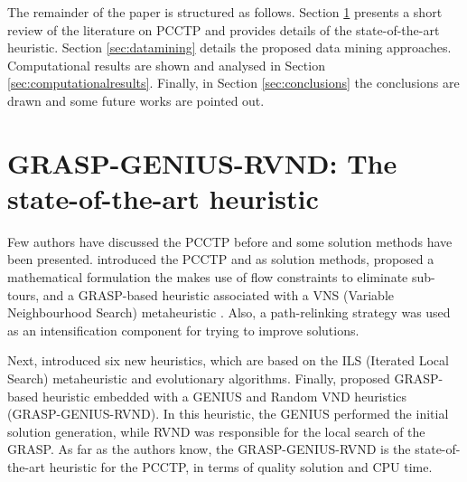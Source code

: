 \documentclass{singlecol-new}
\begin{document}
The remainder of the paper is structured as follows.  Section \ref{sec:grasp} presents a short review of the literature on PCCTP and provides details of the state-of-the-art heuristic. Section \ref{sec:datamining} details the proposed data mining approaches. Computational results are shown and analysed in Section \ref{sec:computationalresults}. Finally, in Section \ref{sec:conclusions} the conclusions are drawn and some future works are pointed out.


\section{GRASP-GENIUS-RVND: The state-of-the-art heuristic}

\label{sec:grasp}

Few authors have discussed the PCCTP before and some solution methods have been presented. \citep{lyra2004problema} introduced the PCCTP and as solution methods, proposed a mathematical formulation the makes use of flow constraints to eliminate sub-tours, and a GRASP-based heuristic  \citep{grasp03}   associated with a VNS (Variable Neighbourhood Search) metaheuristic \citep{mladenovic97}.  Also, a path-relinking strategy was used as an intensification component for trying to improve solutions.

Next, \citet{silva2009problema} introduced  six new heuristics,  which are based on the ILS (Iterated Local Search) metaheuristic and evolutionary algorithms. Finally, \citet{daSilva} proposed GRASP-based heuristic embedded with a GENIUS \citep{genius} and Random VND \citep{mladenovic12} heuristics (GRASP-GENIUS-RVND). In this heuristic, the GENIUS performed the initial solution generation, while RVND was responsible for the local search of the GRASP. As far as the authors know, the GRASP-GENIUS-RVND is the state-of-the-art heuristic for the PCCTP, in terms of quality solution and CPU time.



\end{document}
